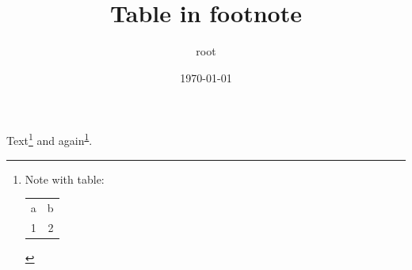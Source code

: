 \documentclass[11pt]{article}
\author{root}
\date{\today}
\title{Table in footnote}
\begin{document}
\maketitle
Text\footnote{Note with table:

\begin{center}
\begin{tabular}{rr}
a & b\\[0pt]
1 & 2\\[0pt]
\end{tabular}
\end{center}\label{orgdafe45c}} and again\textsuperscript{\ref{orgdafe45c}}.
\end{document}

